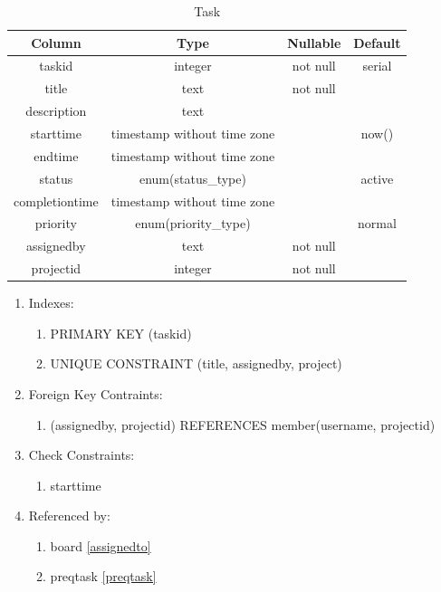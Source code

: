 \documentclass[conference,onecolumn]{IEEEtran}
\begin{document}
\begin{table}[htbp]
  \caption{Task}
  \begin{center}
    \begin{tabular}{|c|c|c|c|}
      \hline
      \textbf{Column} & \textbf{Type} & \textbf{Nullable} & \textbf{Default}\\
      \hline
      taskid & integer & not null & serial\\
      title & text & not null &\\
      description & text &&\\
      starttime & timestamp without time zone && now()\\
      endtime & timestamp without time zone &&\\
      status & enum(status\_type) && active\\
      completiontime & timestamp without time zone &&\\
      priority & enum(priority\_type) && normal\\
      assignedby & text & not null &\\
      projectid & integer & not null &\\
      \hline
    \end{tabular}
    \begin{enumerate}
    \item Indexes:
      \begin{enumerate}
      \item PRIMARY KEY (taskid)
      \item UNIQUE CONSTRAINT (title, assignedby, project)
      \end{enumerate}
    \item Foreign Key Contraints:
      \begin{enumerate}
        \item (assignedby, projectid) REFERENCES member(username, projectid)
      \end{enumerate}
    \item Check Constraints:
      \begin{enumerate}
      \item starttime
      \end{enumerate}
    \item Referenced by:
      \begin{enumerate}
      \item board \ref{assignedto}
      \item preqtask \ref{preqtask}
      \end{enumerate}

\end{enumerate}
\end{center}
\end{table}
\end{document}
